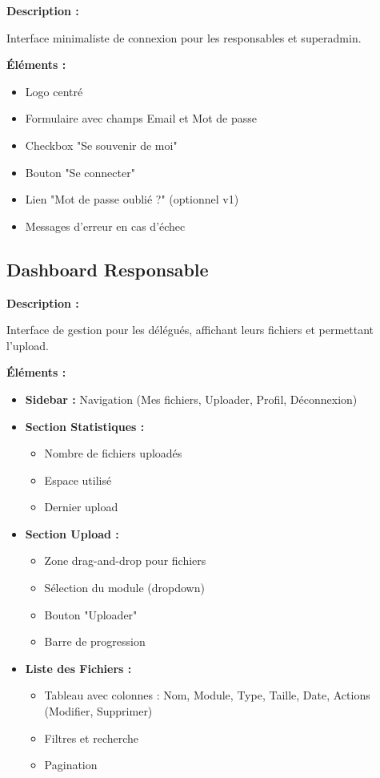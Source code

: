 \documentclass[12pt,a4paper]{article}
\begin{document}
\textbf{Description :}

Interface minimaliste de connexion pour les responsables et superadmin.

\textbf{Éléments :}
\begin{itemize}[leftmargin=*]
    \item Logo centré
    \item Formulaire avec champs Email et Mot de passe
    \item Checkbox "Se souvenir de moi"
    \item Bouton "Se connecter"
    \item Lien "Mot de passe oublié ?" (optionnel v1)
    \item Messages d'erreur en cas d'échec
\end{itemize}

\subsection{Dashboard Responsable}

\textbf{Description :}

Interface de gestion pour les délégués, affichant leurs fichiers et permettant l'upload.

\textbf{Éléments :}
\begin{itemize}[leftmargin=*]
    \item \textbf{Sidebar :} Navigation (Mes fichiers, Uploader, Profil, Déconnexion)
    \item \textbf{Section Statistiques :}
    \begin{itemize}
        \item Nombre de fichiers uploadés
        \item Espace utilisé
        \item Dernier upload
    \end{itemize}
    \item \textbf{Section Upload :}
    \begin{itemize}
        \item Zone drag-and-drop pour fichiers
        \item Sélection du module (dropdown)
        \item Bouton "Uploader"
        \item Barre de progression
    \end{itemize}
    \item \textbf{Liste des Fichiers :}
    \begin{itemize}
        \item Tableau avec colonnes : Nom, Module, Type, Taille, Date, Actions (Modifier, Supprimer)
        \item Filtres et recherche
        \item Pagination
    \end{itemize}
\end{itemize}
\end{document}
